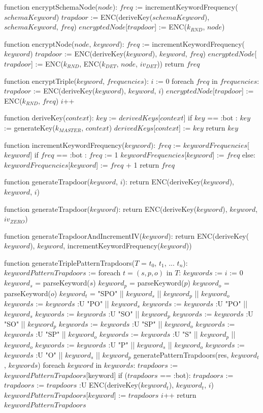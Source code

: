 function encryptSchemaNode($node$):
    $freq$ := incrementKeywordFrequency($schemaKeyword$)
    $trapdoor$ := ENC(deriveKey($schemaKeyword$), $schemaKeyword$, $freq$)
    $encryptedNode$[$trapdoor$] := ENC($k_{RND}$, $node$)
    
function encryptNode($node$, $keyword$):
    $freq$ := incrementKeywordFrequency($keyword$)
    $trapdoor$ := ENC(deriveKey($keyword$), $keyword$, $freq$)
    $encryptedNode$[$trapdoor$] := ENC($k_{RND}$, ENC($k_{DET}$, $node$, $iv_{DET}$))
    return $freq$
 
function encryptTriple($keyword$, $frequencies$): 
    $i$ := 0
    foreach $freq$ in $frequencies$:
        $trapdoor$ := ENC(deriveKey($keyword$), $keyword$, $i$)
        $encryptedNode$[$trapdoor$] := ENC($k_{RND}$, $freq$)
        $i$++

function deriveKey($context$):
    $key$ := $derivedKeys$[$context$]
    if $key$ == :bot :
        $key$ := generateKey($k_{MASTER}$, $context$)
        $derivedKeys$[$context$] := $key$
    return $key$

function incrementKeywordFrequency($keyword$):
    $freq$ := $keywordFrequencies$[$keyword$]
    if $freq$ == :bot :
        $freq$ := 1
        $keywordFrequencies$[$keyword$] := $freq$
    else:
        $keywordFrequencies$[$keyword$] := $freq$ + 1
    return $freq$

function generateTrapdoor($keyword$, $i$):
    return ENC(deriveKey($keyword$), $keyword$, $i$)
    
function generateTrapdoor($keyword$):
    return ENC(deriveKey($keyword$), $keyword$, $iv_{ZERO}$)
	
function generateTrapdoorAndIncrementIV($keyword$):
    return ENC(deriveKey($keyword$), $keyword$, incrementKeywordFrequency($keyword$))

function generateTriplePatternTrapdoors($T$ = {$t_0$, $t_1$, ... $t_n$}):
    $keywordPatternTrapdoors$ := {}
    foreach $t = (s,p,o)$ in $T$:
        $keywords$ := {}
        $i$ := 0
        $keyword_s$ = parseKeyword($s$)
        $keyword_p$ = parseKeyword($p$)
        $keyword_o$ = parseKeyword($o$)
        $keyword_t$ = "SPO" || $keyword_s$ || $keyword_p$ || $keyword_o$
        $keywords$ := $keywords$ :U {"PO" || $keyword_s$}
        $keywords$ := $keywords$ :U {"PO" || $keyword_s$}
        $keywords$ := $keywords$ :U {"SO" || $keyword_p$}
        $keywords$ := $keywords$ :U {"SO" || $keyword_p$}
        $keywords$ := $keywords$ :U {"SP" || $keyword_o$}
        $keywords$ := $keywords$ :U {"SP" || $keyword_o$}
        $keywords$ := $keywords$ :U {"S" || $keyword_p$ || $keyword_o$}
        $keywords$ := $keywords$ :U {"P" || $keyword_s$ || $keyword_o$}
        $keywords$ := $keywords$ :U {"O" || $keyword_s$ || $keyword_p$}
        generatePatternTrapdoors(res, $keyword_t$, $keywords$)
        foreach $keyword$ in $keywords$:
            $trapdoors$ := $keywordPatternTrapdoors$[keyword]
            if ($trapdoors$ == :bot):
                $trapdoors$ := {}
            $trapdoors$ := $trapdoors$ :U {ENC(deriveKey($keyword_t$), $keyword_t$, $i$)}
            $keywordPatternTrapdoors$[$keyword$] := $trapdoors$
            $i$++
    return $keywordPatternTrapdoors$

